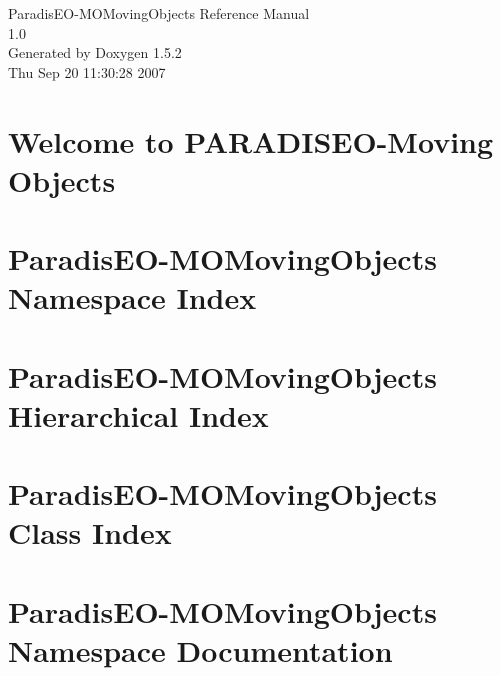 \documentclass[a4paper]{book}
\begin{document}
\begin{titlepage}
\vspace*{7cm}
\begin{center}
{\Large ParadisEO-MOMovingObjects Reference Manual\\[1ex]\large 1.0 }\\
\vspace*{1cm}
{\large Generated by Doxygen 1.5.2}\\
\vspace*{0.5cm}
{\small Thu Sep 20 11:30:28 2007}\\
\end{center}
\end{titlepage}
\clearemptydoublepage
{}
\tableofcontents
\clearemptydoublepage
{}
\chapter{Welcome to PARADISEO-Moving Objects }
\label{index}
\chapter{ParadisEO-MOMovingObjects Namespace Index}

\chapter{ParadisEO-MOMovingObjects Hierarchical Index}

\chapter{ParadisEO-MOMovingObjects Class Index}

\chapter{ParadisEO-MOMovingObjects Namespace Documentation}

\end{document}
